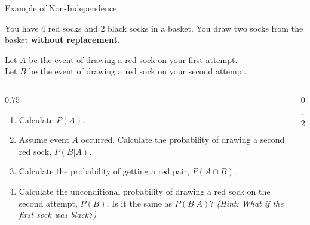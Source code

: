 \begin{frame}{Example of Non-Independence}
    \begin{example}
        You have 4 red socks and 2 black socks in a basket. You draw two socks from the basket \textbf{without replacement}. 
        
        Let $A$ be the event of drawing a red sock on your first attempt. \\
        Let $B$ be the event of drawing a red sock on your second attempt.  

        
        \begin{columns}[T, onlytextwidth]
            \begin{column}{0.75\textwidth}
                \begin{enumerate}
                \small
                    \item Calculate $P(A)$.
                    \item Assume event $A$ occurred. Calculate the probability of drawing a second red sock, $P(B|A)$.
                    \item Calculate the probability of getting a red pair, $P(A \cap B)$. 
                    \item Calculate the unconditional probability of drawing a red sock on the second attempt, $P(B)$. Is it the same as $P(B|A)$? \textit{(Hint: What if the first sock was black?)}
                \end{enumerate}
            \end{column}
            
            \begin{column}{0.2\textwidth}
            \end{column}
        \end{columns}
    \end{example}  
\end{frame}

